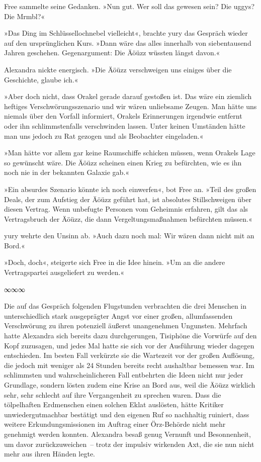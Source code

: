 Free sammelte seine Gedanken. »Nun gut. Wer soll das gewesen sein? Die uggys? Die Mrmbl?«

»Das Ding im Schlüssellochnebel vielleicht«, brachte yury das Gespräch wieder auf den ursprünglichen Kurs. »Dann wäre das alles innerhalb von siebentausend Jahren geschehen. Gegenargument: Die Äöüzz wüssten längst davon.«

Alexandra nickte energisch. »Die Äöüzz verschweigen uns einiges über die Geschichte, glaube ich.«

»Aber doch nicht, dass Orakel gerade darauf gestoßen ist. Das wäre ein ziemlich heftiges Verschwörungsszenario und wir wären unliebsame Zeugen. Man hätte uns niemals über den Vorfall informiert, Orakels Erinnerungen irgendwie entfernt oder ihn schlimmstenfalls verschwinden lassen. Unter keinen Umständen hätte man uns jedoch zu Rat gezogen und als Beobachter eingeladen.«

»Man hätte vor allem gar keine Raumschiffe schicken müssen, wenn Orakels Lage so gewünscht wäre. Die Äöüzz scheinen einen Krieg zu befürchten, wie es ihn noch nie in der bekannten Galaxie gab.«

»Ein absurdes Szenario könnte ich noch einwerfen«, bot Free an. »Teil des großen Deals, der zum Aufstieg der Äöüzz geführt hat, ist absolutes Stillschweigen über diesen Vertrag. Wenn unbefugte Personen vom Geheimnis erfahren, gilt das als Vertragsbruch der Äöüzz, die dann Vergeltungsmaßnahmen befürchten müssen.«

yury wehrte den Unsinn ab. »Auch dazu noch mal: Wir wären dann nicht mit an Bord.«

»Doch, doch«, steigerte sich Free in die Idee hinein. »Um an die andere Vertragspartei ausgeliefert zu werden.«

\begin{center}
∞∞∞
\end{center}

Die auf das Gespräch folgenden Flugstunden verbrachten die drei Menschen in unterschiedlich stark ausgeprägter Angst vor einer großen, allumfassenden Verschwörung zu ihren potenziell äußerst unangenehmen Ungunsten. Mehrfach hatte Alexandra sich bereits dazu durchgerungen, Tisiphöne die Vorwürfe auf den Kopf zuzusagen, und jedes Mal hatte sie sich vor der Ausführung wieder dagegen entschieden. Im besten Fall verkürzte sie die Wartezeit vor der großen Auflösung, die jedoch mit weniger als 24 Stunden bereits recht aushaltbar bemessen war. Im schlimmsten und wahrscheinlicheren Fall entbehrten die Ideen nicht nur jeder Grundlage, sondern lösten zudem eine Krise an Bord aus, weil die Äöüzz wirklich sehr, sehr schlecht auf ihre Vergangenheit zu sprechen waren. Dass die tölpelhaften Erdmenschen einen solchen Eklat auslösten, hätte Kritiker unwiedergutmachbar bestätigt und den eigenen Ruf so nachhaltig ruiniert, dass weitere Erkundungsmissionen im Auftrag einer Örz-Behörde nicht mehr genehmigt werden konnten. Alexandra besaß genug Vernunft und Besonnenheit, um davor zurückzuweichen~– trotz der impulsiv wirkenden Axt, die sie nun nicht mehr aus ihren Händen legte.

